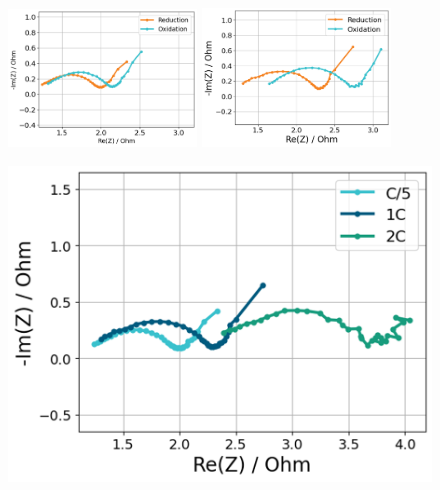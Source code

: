 \begin{figure}[h]
    \includegraphics[width = 5cm]{figures/application5/image7.png}
    \includegraphics[width = 5cm]{figures/application5/image8.png}
\end{figure}

\begin{figure}[h]
    \centering
    \includegraphics[width=0.7\linewidth]{figures/application5/image9.png}
\end{figure}